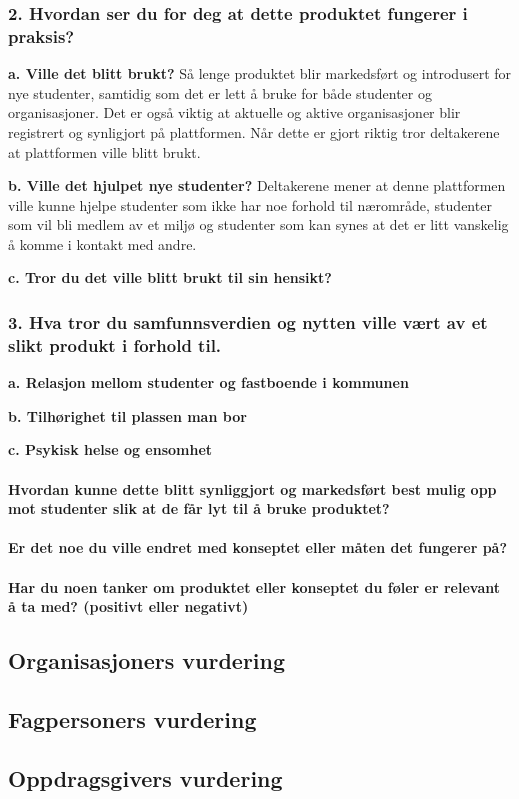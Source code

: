 \subsubsection{2. Hvordan ser du for deg at dette produktet fungerer i praksis?}

{\bf a. Ville det blitt brukt?}
Så lenge produktet blir markedsført og introdusert for nye studenter, samtidig som det er lett å bruke for både studenter og organisasjoner. Det er også viktig at aktuelle og aktive organisasjoner blir registrert og synligjort på plattformen. Når dette er gjort riktig tror deltakerene at plattformen ville blitt brukt. 

{\bf b. Ville det hjulpet nye studenter?}
Deltakerene mener at denne plattformen ville kunne hjelpe studenter som ikke har noe forhold til nærområde, studenter som vil bli medlem av et miljø og studenter som kan synes at det er litt vanskelig å komme i kontakt med andre.

{\bf c. Tror du det ville blitt brukt til sin hensikt?}


\subsubsection{3. Hva tror du samfunnsverdien og nytten ville vært av et slikt produkt i forhold til.}

{\bf a. Relasjon mellom studenter og fastboende i kommunen}

{\bf b. Tilhørighet til plassen man bor}

{\bf c. Psykisk helse og ensomhet}

\paragraph{Hvordan kunne dette blitt synliggjort og markedsført best mulig opp mot studenter slik at de får lyt til å bruke produktet?}

\paragraph{Er det noe du ville endret med konseptet eller måten det fungerer på?}

\paragraph{Har du noen tanker om produktet eller konseptet du føler er relevant å ta med? (positivt eller negativt)}

\subsection{Organisasjoners vurdering}

\subsection{Fagpersoners vurdering}

\subsection{Oppdragsgivers vurdering}



